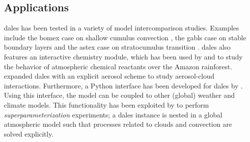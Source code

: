 \newpage

\subsection{Applications}
\acrshort{dales} has been tested in a variety of model intercomparison studies. Examples include the \acrshort{bomex} case on shallow cumulus convection \citep{siebesmaLargeEddySimulation2003}, the \acrshort{gabls} case on stable boundary layers \citep{beareIntercomparisonLargeEddySimulations2006} and the \acrshort{astex} case on stratocumulus transition \citep{vanderdussenGASSEUCLIPSEModel2013}. \acrshort{dales} also features an interactive chemistry module, which has been used by \citet{vila-gueraudearellanoRoleBoundaryLayer2011} and \citet{ouwerslootQuantifyingTransportSubcloud2013} to study the behavior of atmospheric chemical reactants over the Amazon rainforest. \citet{debruineExplicitAerosolCloud2019} expanded \acrshort{dales} with an explicit aerosol scheme to study aerosol-cloud interactions. Furthermore, a Python interface has been developed for \acrshort{dales} by \citet{vandenoordPythonInterfaceDutch2020}. Using this interface, the model can be coupled to other (global) weather and climate models. This functionality has been exploited by \citet{janssonRegionalSuperparameterizationGlobal2019} to perform \emph{superparameterization} experiments; a \acrshort{dales} instance is nested in a global atmospheric model such that processes related to clouds and convection are solved explicitly.